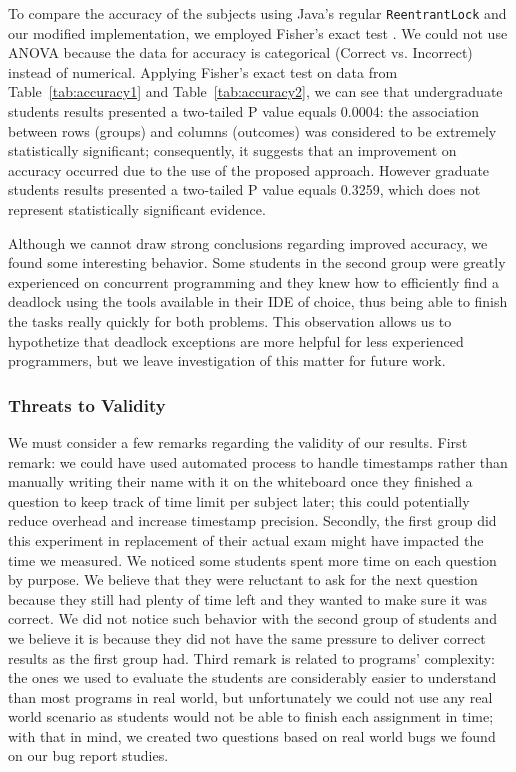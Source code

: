 To compare the accuracy of the subjects using Java's regular {\tt ReentrantLock} and our modified implementation, we employed Fisher's exact test \cite{agresti}. We could not use ANOVA because the data for accuracy is categorical (Correct vs. Incorrect) instead of numerical. 
Applying Fisher's exact test on data from Table~\ref{tab:accuracy1} and Table~\ref{tab:accuracy2}, we can see that undergraduate students results presented a two-tailed P value equals 0.0004: the association between rows (groups) and columns (outcomes) was considered to be extremely statistically significant; consequently, it suggests that an improvement on accuracy occurred due to the use of the proposed approach. However graduate students results presented a two-tailed P value equals 0.3259, which does not represent statistically significant evidence.

Although we cannot draw strong conclusions regarding improved accuracy, we found some interesting behavior. Some students in the second group were greatly experienced on concurrent programming and they knew how to efficiently find a deadlock using the tools available in their IDE of choice, thus being able to finish the tasks really quickly for both problems. This observation allows us to hypothetize that deadlock exceptions are more helpful for less experienced programmers, but we leave investigation of this matter for future work.

\subsubsection{Threats to Validity}

We must consider a few remarks regarding the validity of our results. First remark: we could have used automated process to handle timestamps rather than manually writing their name with it on the whiteboard once they finished a question to keep track of time limit per subject later; this could potentially reduce overhead and increase timestamp precision.
Secondly, the first group did this experiment in replacement of their actual exam might have impacted the time we measured. We noticed some students spent more time on each question by purpose. We believe that they were reluctant to ask for the next question because they still had plenty of time left and they wanted to make sure it was correct. We did not notice such behavior with the second group of students and we believe it is because they did not have the same pressure to deliver correct results as the first group had.
Third remark is related to programs' complexity: the ones we used to evaluate the students are considerably easier to understand than most programs in real world, but unfortunately we could not use any real world scenario as students would not be able to finish each assignment in time; with that in mind, we created two questions based on real world bugs we found on our bug report studies.

